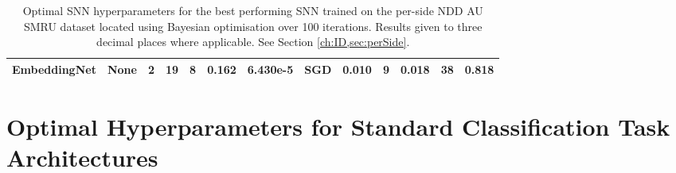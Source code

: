 \begin{table}[!ht]
{\begin{tabular}{ccccccccccccc}
			EmbeddingNet                                                       & None                                                                        & 2                                                                 & 19                                                                                     & 8                                                                                             & 0.162            & 6.430e-5                                                          & SGD               & 0.010                                                                            & 9                                                                                & 0.018             & 38                                                               & 0.818                                                                              \\
			\bottomrule                                                      
	\end{tabular}}
	\caption[Optimal SNN hyperparameters for the best performing SNN trained on the per-side NDD AU SMRU dataset located using Bayesian optimisation over 100 iterations.]{Optimal SNN hyperparameters for the best performing SNN trained on the per-side NDD AU SMRU dataset located using Bayesian optimisation over 100 iterations. Results given to three decimal places where applicable. See Section \ref{ch:ID,sec:perSide}.}
\end{table}

\section{Optimal Hyperparameters for Standard Classification Task Architectures}\label{app:standard}

